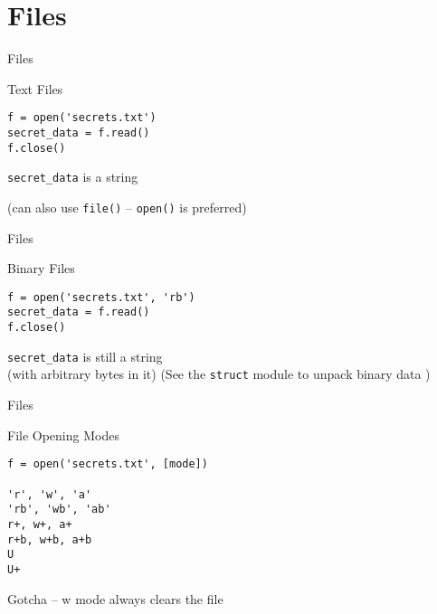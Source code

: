 \documentclass{beamer}
\begin{document}
\section{Files}

\begin{frame}[fragile]{Files}

{\Large Text Files}

\begin{verbatim}
f = open('secrets.txt')
secret_data = f.read()
f.close()
\end{verbatim}

{\Large \verb|secret_data| is a string}

\vfill
(can also use \verb|file()| -- \verb|open()| is preferred)
\end{frame}

\begin{frame}[fragile]{Files}

{\Large Binary Files}

\begin{verbatim}
f = open('secrets.txt', 'rb')
secret_data = f.read()
f.close()
\end{verbatim}

{\Large \verb|secret_data| is still a string \\[.1in]
(with arbitrary bytes in it)}
\vfill
(See the \verb|struct| module to unpack binary data )
\end{frame}

\begin{frame}[fragile]{Files}

{\Large File Opening Modes}
\vfill
\begin{verbatim}
f = open('secrets.txt', [mode])

'r', 'w', 'a'
'rb', 'wb', 'ab'
r+, w+, a+
r+b, w+b, a+b
U
U+
\end{verbatim}
\vfill
{\Large Gotcha -- w mode always clears the file}
\end{frame}
\end{document}
